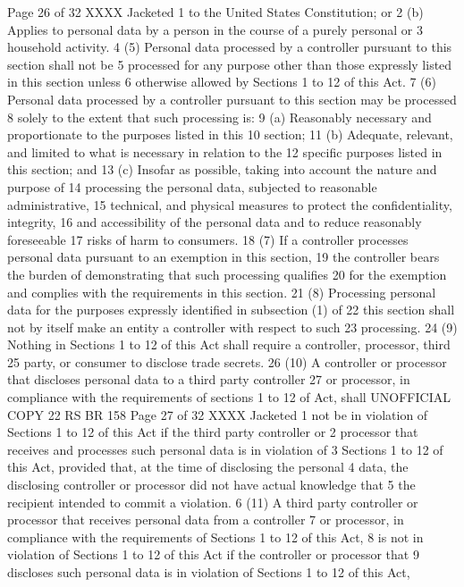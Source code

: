 Page 26 of 32
XXXX Jacketed
1 to the United States Constitution; or
2 (b) Applies to personal data by a person in the course of a purely personal or
3 household activity.
4 (5) Personal data processed by a controller pursuant to this section shall not be
5 processed for any purpose other than those expressly listed in this section unless
6 otherwise allowed by Sections 1 to 12 of this Act.
7 (6) Personal data processed by a controller pursuant to this section may be processed
8 solely to the extent that such processing is:
9 (a) Reasonably necessary and proportionate to the purposes listed in this
10 section;
11 (b) Adequate, relevant, and limited to what is necessary in relation to the
12 specific purposes listed in this section; and
13 (c) Insofar as possible, taking into account the nature and purpose of
14 processing the personal data, subjected to reasonable administrative,
15 technical, and physical measures to protect the confidentiality, integrity,
16 and accessibility of the personal data and to reduce reasonably foreseeable
17 risks of harm to consumers.
18 (7) If a controller processes personal data pursuant to an exemption in this section,
19 the controller bears the burden of demonstrating that such processing qualifies
20 for the exemption and complies with the requirements in this section.
21 (8) Processing personal data for the purposes expressly identified in subsection (1) of
22 this section shall not by itself make an entity a controller with respect to such
23 processing.
24 (9) Nothing in Sections 1 to 12 of this Act shall require a controller, processor, third
25 party, or consumer to disclose trade secrets.
26 (10) A controller or processor that discloses personal data to a third party controller
27 or processor, in compliance with the requirements of sections 1 to 12 of Act, shall 
UNOFFICIAL COPY 22 RS BR 158
Page 27 of 32
XXXX Jacketed
1 not be in violation of Sections 1 to 12 of this Act if the third party controller or
2 processor that receives and processes such personal data is in violation of
3 Sections 1 to 12 of this Act, provided that, at the time of disclosing the personal
4 data, the disclosing controller or processor did not have actual knowledge that
5 the recipient intended to commit a violation.
6 (11) A third party controller or processor that receives personal data from a controller
7 or processor, in compliance with the requirements of Sections 1 to 12 of this Act,
8 is not in violation of Sections 1 to 12 of this Act if the controller or processor that
9 discloses such personal data is in violation of Sections 1 to 12 of this Act,
